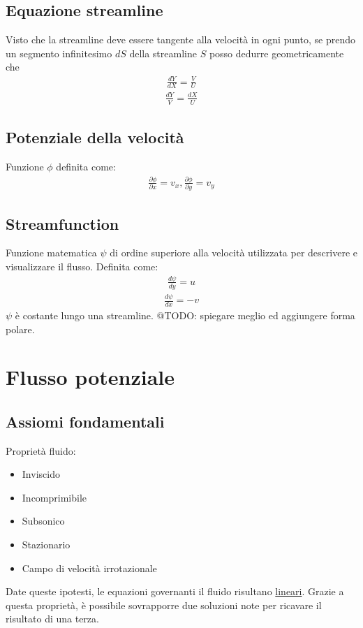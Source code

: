 \documentclass[11pt]{article}
\begin{document}
\subsection{Equazione streamline}
\label{sec:orgd463c26}
Visto che la streamline deve essere tangente alla velocità in ogni punto, se prendo un segmento infinitesimo \(dS\) della streamline \(S\) posso dedurre geometricamente che
\begin{gather*}
    \frac{dY}{dX} = \frac{V}{U}
\end{gather*}
\begin{gather*}
    \frac{dY}{V} = \frac{dX}{U}
\end{gather*}
\subsection{Potenziale della velocità}
\label{sec:orgb614d2d}
Funzione \(\phi\) definita come:
    \begin{gather*}
\frac{\partial \phi}{\partial x} = v_x , \frac{\partial \phi}{\partial y} = v_y
    \end{gather*}
\subsection{Streamfunction}
\label{sec:org301627d}
Funzione matematica \(\psi\) di ordine superiore alla velocità utilizzata per descrivere e visualizzare il flusso. Definita come:
\begin{gather*}
    \frac{d \psi}{dy} = u
\end{gather*}
\begin{gather*}
    \frac{d \psi}{dx} = -v
\end{gather*}
\(\psi\) è costante lungo una streamline. @TODO: spiegare meglio ed aggiungere forma polare.
\section{Flusso potenziale}
\label{sec:orgf026e3e}
\subsection{Assiomi fondamentali}
\label{sec:org9d5959c}
Proprietà fluido:
\begin{itemize}
\item Inviscido
\item Incomprimibile
\item Subsonico
\item Stazionario
\item Campo di velocità irrotazionale
\end{itemize}
Date queste ipotesti, le equazioni governanti il fluido risultano \uline{lineari}. Grazie a questa proprietà, è possibile sovrapporre due soluzioni note per ricavare il risultato di una terza.
\end{document}
